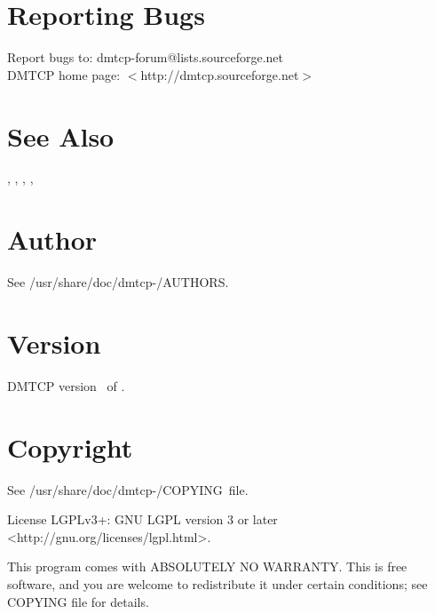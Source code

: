 \section{Reporting Bugs}
Report bugs to: dmtcp-forum@lists.sourceforge.net\\
DMTCP home page: $<$http://dmtcp.sourceforge.net$>$

\section{See Also}
, , ,
, 

\section{Author}
See /usr/share/doc/dmtcp-\Version/AUTHORS.

\section{Version}

DMTCP version \Version\ of \Date.

\section{Copyright}
See /usr/share/doc/dmtcp-\Version/COPYING~file.

License LGPLv3+: GNU LGPL version 3 or later <http://gnu.org/licenses/lgpl.html>.

This program comes with ABSOLUTELY NO WARRANTY.
This is free software, and you are welcome to redistribute it under certain
conditions; see COPYING file for details.
